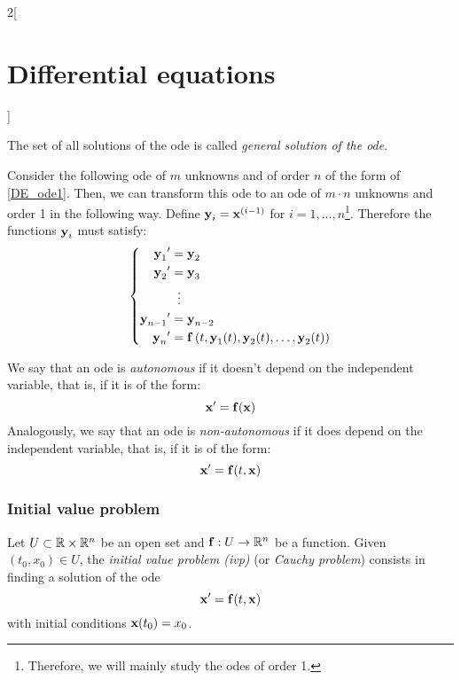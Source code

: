 \documentclass[../../../main.tex]{subfiles}
\begin{document}
\begin{multicols}{2}[\section{Differential equations}]
\begin{definition}
\begin{itemize}
    \end{itemize}
    The set of all solutions of the ode is called \textit{general solution of the ode}.
  \end{definition}
  \begin{prop}
    Consider the following ode of $m$ unknowns and of order $n$ of the form of \eqref{DE_ode1}. Then, we can transform this ode to an ode of $m\cdot n$ unknowns and order 1 in the following way. Define $\boldsymbol{\mathrm{y}}_i=\boldsymbol{\mathrm{x}}^{(i-1)}$ for $i=1,\ldots,n$\footnote{Therefore, we will mainly study the odes of order 1.}. Therefore the functions $\boldsymbol{\mathrm{y}}_i$ must satisfy:
    \begin{equation*}
      \left\{
      \begin{aligned}
        {\boldsymbol{\mathrm{y}}_1}'     & =\boldsymbol{\mathrm{y}}_2                                                                                            \\
        {\boldsymbol{\mathrm{y}}_2}'     & =\boldsymbol{\mathrm{y}}_3                                                                                            \\
                                    & \;\;\vdots                                                                                                       \\
        {\boldsymbol{\mathrm{y}}_{n-1}}' & =\boldsymbol{\mathrm{y}}_{n-2}                                                                                        \\
        {\boldsymbol{\mathrm{y}}_n}'     & =\boldsymbol{\mathrm{f}}\left(t,\boldsymbol{\mathrm{y}}_1(t),\boldsymbol{\mathrm{y}}_2(t),\ldots,\boldsymbol{\mathrm{y}}_2(t)\right) \\
      \end{aligned}
      \right.
    \end{equation*}
  \end{prop}
  \begin{definition}
    We say that an ode is \textit{autonomous} if it doesn't depend on the independent variable, that is, if it is of the form: $$\boldsymbol{\mathrm{x}}'=\boldsymbol{\mathrm{f}}(\boldsymbol{\mathrm{x}})$$ Analogously, we say that an ode is \textit{non-autonomous} if it does depend on the independent variable, that is, if it is of the form: $$\boldsymbol{\mathrm{x}}'=\boldsymbol{\mathrm{f}}(t,\boldsymbol{\mathrm{x}})$$
  \end{definition}
  \subsubsection*{Initial value problem}
  \begin{definition}
    Let $U\subset\mathbb{R}\times\mathbb{R}^n$ be an open set and $\boldsymbol{\mathrm{f}}:U\rightarrow\mathbb{R}^n$ be a function. Given $(t_0,x_0)\in U$, the \textit{initial value problem (ivp)} (or \textit{Cauchy problem}) consists in finding a solution of the ode $$\boldsymbol{\mathrm{x}}'=\boldsymbol{\mathrm{f}}(t,\boldsymbol{\mathrm{x}})$$ with initial conditions $\boldsymbol{\mathrm{x}}(t_0)=x_0$.
  \end{definition}

\end{multicols}
\end{document}
